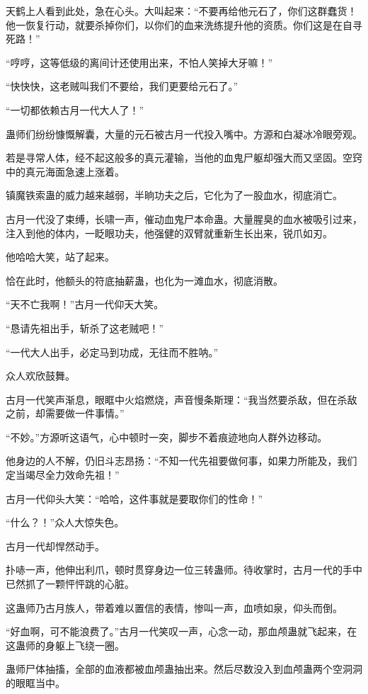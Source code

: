 \begin{this_body}
天鹤上人看到此处，急在心头。大叫起来：“不要再给他元石了，你们这群蠢货！他一恢复行动，就要杀掉你们，以你们的血来洗练提升他的资质。你们这是在自寻死路！”

“哼哼，这等低级的离间计还使用出来，不怕人笑掉大牙嘛！”

“快快快，这老贼叫我们不要给，我们更要给元石了。”

“一切都依赖古月一代大人了！”

蛊师们纷纷慷慨解囊，大量的元石被古月一代投入嘴中。方源和白凝冰冷眼旁观。

若是寻常人体，经不起这般多的真元灌输，当他的血鬼尸躯却强大而又坚固。空窍中的真元海面急速上涨着。

镇魔铁索蛊的威力越来越弱，半晌功夫之后，它化为了一股血水，彻底消亡。

古月一代没了束缚，长啸一声，催动血鬼尸本命蛊。大量腥臭的血水被吸引过来，注入到他的体内，一眨眼功夫，他强健的双臂就重新生长出来，锐爪如刃。

他哈哈大笑，站了起来。

恰在此时，他额头的符底抽薪蛊，也化为一滩血水，彻底消散。

“天不亡我啊！”古月一代仰天大笑。

“恳请先祖出手，斩杀了这老贼吧！”

“一代大人出手，必定马到功成，无往而不胜呐。”

众人欢欣鼓舞。

古月一代笑声渐息，眼眶中火焰燃烧，声音慢条斯理：“我当然要杀敌，但在杀敌之前，却需要做一件事情。”

“不妙。”方源听这语气，心中顿时一突，脚步不着痕迹地向人群外边移动。

他身边的人不解，仍旧斗志昂扬：“不知一代先祖要做何事，如果力所能及，我们定当竭尽全力效命先祖！”

古月一代仰头大笑：“哈哈，这件事就是要取你们的性命！”

“什么？！”众人大惊失色。

古月一代却悍然动手。

扑哧一声，他伸出利爪，顿时贯穿身边一位三转蛊师。待收掌时，古月一代的手中已然抓了一颗怦怦跳的心脏。

这蛊师乃古月族人，带着难以置信的表情，惨叫一声，血喷如泉，仰头而倒。

“好血啊，可不能浪费了。”古月一代笑叹一声，心念一动，那血颅蛊就飞起来，在这蛊师的身躯上飞绕一圈。

蛊师尸体抽搐，全部的血液都被血颅蛊抽出来。然后尽数没入到血颅蛊两个空洞洞的眼眶当中。


\end{this_body}
